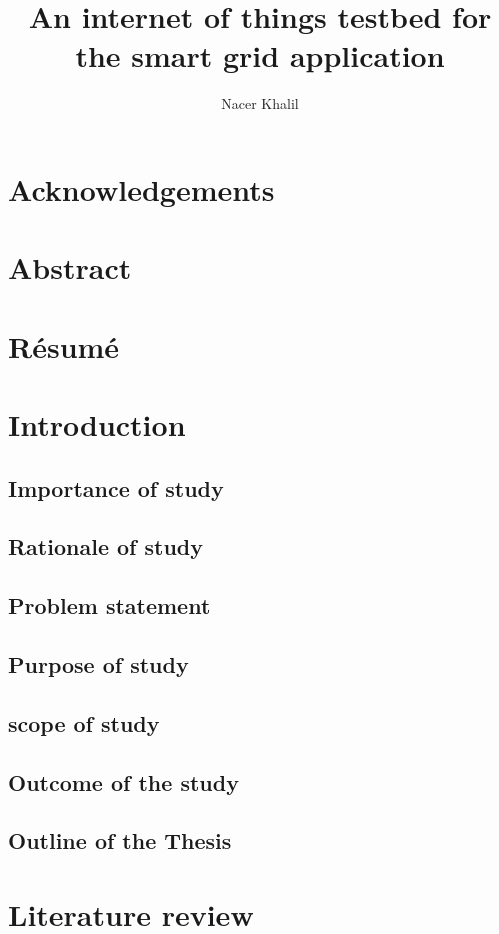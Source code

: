 \documentclass[oneside,12pt,a4paper,final]{book}
\author{Nacer Khalil}
\title{An internet of things testbed for the smart grid application}
\begin{document}
\frontmatter

\chapter{Acknowledgements}

\chapter{Abstract}
\chapter{Résumé}

\tableofcontents


\mainmatter
\chapter{Introduction}
\section{Importance of study}
\section{Rationale of study}
\section{Problem statement}
\section{Purpose of study}
\section{scope of study}
\section{Outcome of the study}
\section{Outline of the Thesis}

\chapter{Literature review}
\end{document}
